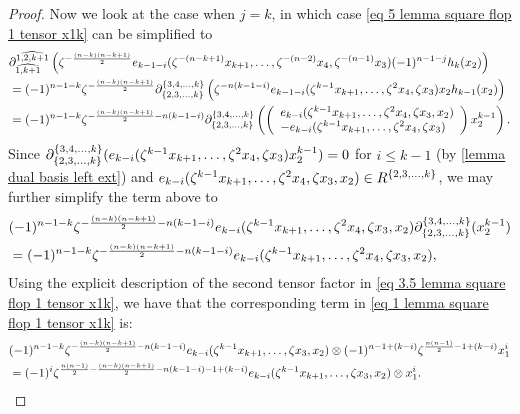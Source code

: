 \begin{proof}
    Now we look at the case when $j=k$, in which case \eqref{eq 5 lemma square flop 1 tensor x1k} can be simplified to
    \begin{align*}
       &\partial^{\widehat{1,2, k+1}}_{\widehat{1,k+1}}\left(\zeta^{-\frac{(n-k)(n-k+1)}{2}}e_{k-1-i}(\zeta^{-(n-k+1)}x_{k+1}, \ldots, \zeta^{-(n-2)}x_4, \zeta^{-(n-1)}x_3)(-1)^{n-1-j}h_{k}(x_2)\right) \\
       &=(-1)^{n-1-k}\zeta^{-\frac{(n-k)(n-k+1)}{2}}\partial^{\{3,4, \ldots, k\}}_{\{2, 3, \ldots, k\}}\left(\zeta^{-n(k-1-i)}e_{k-1-i}(\zeta^{k-1}x_{k+1}, \ldots, \zeta^{2}x_4, \zeta x_3)x_2 h_{k-1}(x_2)\right)\\
       &=(-1)^{n-1-k}\zeta^{-\frac{(n-k)(n-k+1)}{2}-n(k-1-i)}\partial^{\{3,4, \ldots, k\}}_{\{2, 3, \ldots, k\}}\left(
       \left(\begin{array}{ll}
       e_{k-i}(\zeta^{k-1}x_{k+1}, \ldots, \zeta^{2}x_4, \zeta x_3,x_2) \\
       -e_{k-i}(\zeta^{k-1}x_{k+1}, \ldots, \zeta^{2}x_4, \zeta x_3)
       \end{array}\right)x_2^{k-1}
       \right).
    \end{align*}
     Since $\partial^{\{3,4, \ldots, k\}}_{\{2, 3, \ldots, k\}}(e_{k-i}(\zeta^{k-1}x_{k+1}, \ldots, \zeta^{2}x_4, \zeta x_3)x_2^{k-1})=0$ for $i\leq k-1$ (by \cref{lemma dual basis left ext}) and $e_{k-i}(\zeta^{k-1}x_{k+1}, \ldots, \zeta^{2}x_4, \zeta x_3,x_2) \in R^{\{2,3, \ldots ,k\}}$, we may further simplify the term above to
     \begin{align}
     \notag &(-1)^{n-1-k}\zeta^{-\frac{(n-k)(n-k+1)}{2}-n(k-1-i)}e_{k-i}(\zeta^{k-1}x_{k+1}, \ldots, \zeta^{2}x_4, \zeta x_3,x_2)\partial^{\{3,4, \ldots, k\}}_{\{2, 3, \ldots, k\}}(
       x_2^{k-1})\\
       &=(-1)^{n-1-k}\zeta^{-\frac{(n-k)(n-k+1)}{2}-n(k-1-i)}e_{k-i}(\zeta^{k-1}x_{k+1}, \ldots, \zeta^{2}x_4, \zeta x_3,x_2),  
     \end{align}
     Using the explicit description of the second tensor factor in \eqref{eq 3.5 lemma square flop 1 tensor x1k}, we have that the corresponding term in \eqref{eq 1 lemma square flop 1 tensor x1k} is:
     \begin{align}
      \notag  &(-1)^{n-1-k}\zeta^{-\frac{(n-k)(n-k+1)}{2}-n(k-1-i)}e_{k-i}(\zeta^{k-1}x_{k+1}, \ldots, \zeta x_3,x_2)\otimes (-1)^{n-1+(k-i)}\zeta^{\frac{n(n-1)}{2}-1+(k-i)}x_1^{i} \\
      &=(-1)^{i}\zeta^{\frac{n(n-1)}{2}-\frac{(n-k)(n-k+1)}{2}-n(k-1-i)-1+(k-i)}e_{k-i}(\zeta^{k-1}x_{k+1}, \ldots,  \zeta x_3,x_2)\otimes x_1^{i} \label{eq 7 lemma square flop 1 tensor x1k}.
     \end{align}
     

\end{proof}

